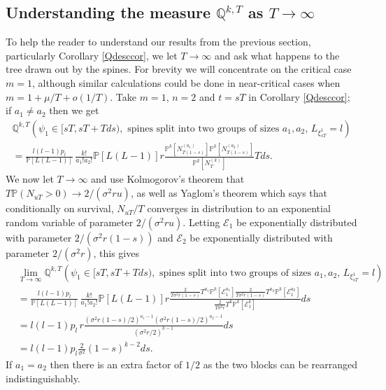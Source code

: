 \documentclass{article}
\theoremstyle{plain}
\theoremstyle{definition}
\newcommand{\Q}{\mathbb{Q}}
\renewcommand{\P}{\mathbb{P}}
\begin{document}
\subsection{Understanding the measure $\Q^{k,T}$ as $T\to\infty$}\label{QTlargeTsec}
To help the reader to understand our results from the previous section, particularly Corollary \ref{Qdesccor}, we let $T\to\infty$ and ask what happens to the tree drawn out by the spines. For brevity we will concentrate on the critical case $m=1$, although similar calculations could be done in near-critical cases when $m=1+\mu/T + o(1/T)$. Take $m=1$, $n=2$ and $t=sT$ in Corollary \ref{Qdesccor}; if $a_1\neq a_2$ then we get
\begin{multline*}
\Q^{k,T} \left( \psi_1 \in [sT, sT+Tds), \text{ spines split into two groups of sizes } a_1,a_2,\, L_{\xi^1_{sT}} = l \right)\\
=  \frac{l(l-1)p_l}{\P[L(L-1)]}\, \frac{k!}{a_1!a_2!} \P[L(L-1)]r\frac{\P^k [ N_{T(1-s)}^{(a_1)} ]\P^k [ N_{T(1-s)}^{(a_2)} ]}{ \P^k[N_{T}^{(k)} ] } T ds.
\end{multline*}
We now let $T\to\infty$ and use Kolmogorov's theorem that $T\P(N_{uT}>0)\to 2/(\sigma^2 r u)$, as well as Yaglom's theorem which says that conditionally on survival, $N_{uT}/T$ converges in distribution to an exponential random variable of parameter $2/(\sigma^2 r u)$. Letting $\mathcal E_1$ be exponentially distributed with parameter $2/(\sigma^2 r (1-s))$ and $\mathcal E_2$ be exponentially distributed with parameter $2/(\sigma^2 r)$, this gives
\begin{align*}
&\lim_{T\to\infty}\Q^{k,T} \left( \psi_1 \in [sT, sT+Tds), \text{ spines split into two groups of sizes } a_1,a_2,\, L_{\xi^1_{sT}} = l \right)\\
&= \frac{l(l-1)p_l}{\P[L(L-1)]}\, \frac{k!}{a_1!a_2!} \P[L(L-1)]r\frac{\frac{2}{T\sigma^2 r(1-s)}T^{a_1}\P^k [ \mathcal E_1^{a_1} ]\frac{2}{T\sigma^2 r(1-s)}T^{a_2}\P^k [ \mathcal E_1^{a_2} ]}{ \frac{2}{T\sigma^2 r}T^{k}\P^k [ \mathcal E_1^{k} ] } ds\\
&= l(l-1)p_l\, r \frac{(\sigma^2 r(1-s)/2)^{a_1-1}(\sigma^2 r(1-s)/2)^{a_2-1}}{ (\sigma^2 r/2)^{k-1} } ds\\
&= l(l-1)p_l \frac{2}{\sigma^2}(1-s)^{k-2}ds.
\end{align*}
If $a_1=a_2$ then there is an extra factor of $1/2$ as the two blocks can be rearranged indistinguishably.
\end{document}

